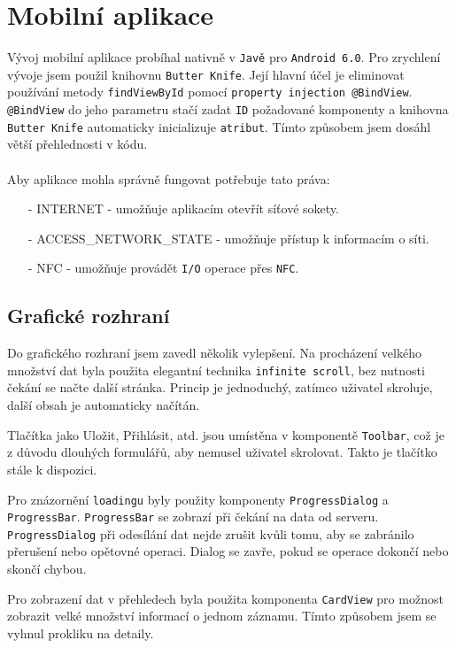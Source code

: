 \documentclass[czech,BP]{thesiskiv}
\begin{document}
\chapter{Mobilní aplikace}
	Vývoj mobilní aplikace probíhal nativně v \texttt{Javě} pro \texttt{Android 6.0}.
	Pro zrychlení vývoje jsem použil knihovnu \texttt{Butter Knife}. Její hlavní účel je eliminovat používání metody \texttt{findViewById} pomocí \texttt{property injection @BindView}.
	\texttt{@BindView} do jeho parametru stačí zadat \texttt{ID} požadované komponenty a knihovna \texttt{Butter Knife} automaticky inicializuje \texttt{atribut}. Tímto způsobem jsem dosáhl větší přehlednosti v kódu.
\\\\
Aby aplikace mohla správně fungovat potřebuje tato práva:
\begin{itemize}[noitemsep]
\item [-] INTERNET - umožňuje aplikacím otevřít síťové sokety.
\item [-] ACCESS\_NETWORK\_STATE - umožňuje přístup k informacím o síti.
\item [-] NFC - umožňuje provádět \texttt{I/O} operace přes \texttt{NFC}.
\end{itemize}	
		
\section{Grafické rozhraní}
Do grafického rozhraní jsem zavedl několik vylepšení. Na procházení velkého množství dat byla použita elegantní technika \texttt{infinite scroll}, bez nutnosti čekání se načte další stránka. Princip je jednoduchý, zatímco uživatel skroluje, další obsah je automaticky načítán.
				
Tlačítka jako Uložit, Přihlásit, atd. jsou umístěna v komponentě \texttt{Toolbar}, což je z důvodu dlouhých formulářů, aby nemusel uživatel skrolovat. Takto je tlačítko stále k dispozici.
	
Pro znázornění \texttt{loadingu} byly použity komponenty \texttt{ProgressDialog} a \texttt{ProgressBar}.
\texttt{ProgressBar} se zobrazí při čekání na data od serveru.
\texttt{ProgressDialog} při odesílání dat nejde zrušit kvůli tomu, aby se zabránilo přerušení nebo opětovné operaci. Dialog se zavře, pokud se operace dokončí nebo skončí chybou.

Pro zobrazení dat v přehledech byla použita komponenta \texttt{CardView} pro možnost zobrazit velké množství informací o jednom záznamu. Tímto způsobem jsem se vyhnul prokliku na detaily.
\end{document}
